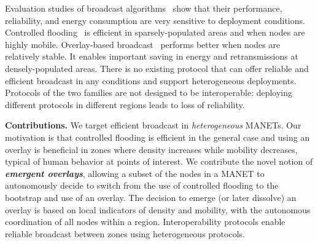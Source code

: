 Evaluation studies of broadcast algorithms~\citep{DensityMobDrivenEval,Williams2002} show that their performance, reliability, and energy consumption are very sensitive to deployment conditions.
Controlled flooding~\citep{ObraczkaK_2001, adaptive_group_com_iscc02} is efficient in sparsely-populated areas and when nodes are highly mobile.
Overlay-based broadcast~\citep{Nikolov2015, stojmenovic-cds, mpr} performs better when nodes are relatively stable.
It enables important saving in energy and retransmissions at densely-populated areas.
%
There is no existing protocol that can offer reliable and efficient broadcast in any conditions and support heterogeneous deployments.
Protocols of the two families are not designed to be interoperable: deploying different protocols in different regions leads to loss of reliability.


\smallskip
\noindent
\textbf{Contributions.}
%
We target efficient broadcast in \emph{heterogeneous} MANETs.
Our motivation is that controlled flooding is efficient in the general case and using an overlay is beneficial in zones where density increases while mobility decreases, typical of human behavior at points of interest.
%
We contribute the novel notion of \emph{\textbf{emergent overlays}}, allowing a subset of the nodes in a MANET to autonomously decide to switch from the use of controlled flooding to the bootstrap and use of an overlay.
%
The decision to emerge (or later dissolve) an overlay is based on local indicators of density and mobility, with the autonomous coordination of all nodes within a region.
%
Interoperability protocols enable reliable broadcast between zones using heterogeneous protocols.

